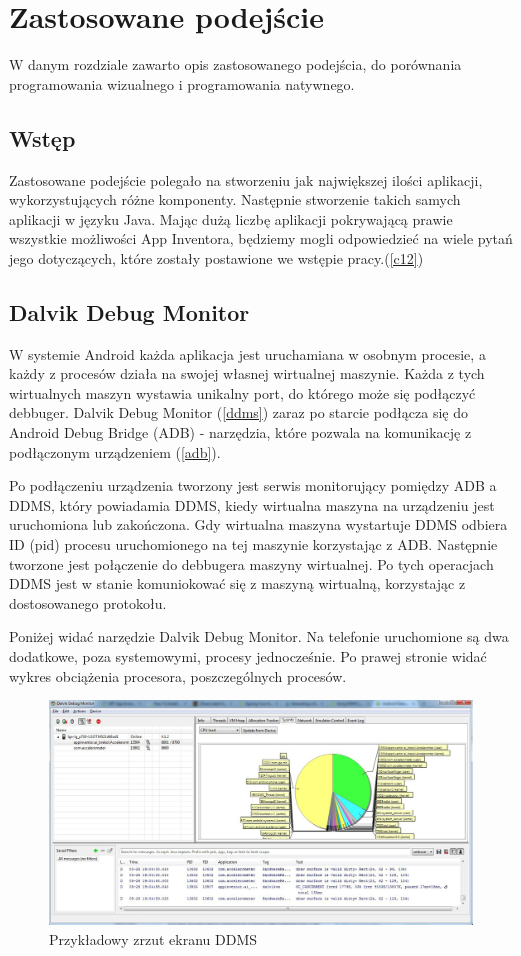 \chapter{Zastosowane podejście}
\label{c4}

W danym rozdziale zawarto opis zastosowanego podejścia, do porównania programowania wizualnego i programowania natywnego.

\section{Wstęp}
\label{c41}

Zastosowane podejście polegało na stworzeniu jak największej ilości aplikacji, wykorzystujących różne komponenty. Następnie stworzenie takich samych aplikacji w języku Java. Mając dużą liczbę aplikacji pokrywającą prawie wszystkie możliwości App Inventora, będziemy mogli odpowiedzieć na wiele pytań jego dotyczących, które zostały postawione we wstępie pracy.(\ref{c12})

\section{Dalvik Debug Monitor}

W systemie Android każda aplikacja jest uruchamiana w osobnym procesie, a każdy z procesów działa na swojej własnej wirtualnej maszynie. Każda z tych wirtualnych maszyn wystawia unikalny port, do którego może się podłączyć debbuger. Dalvik Debug Monitor (\ref{ddms}) zaraz po starcie podłącza się do Android Debug Bridge (ADB) - narzędzia, które pozwala na komunikację z podłączonym urządzeniem (\ref{adb}).

Po podłączeniu urządzenia tworzony jest serwis monitorujący pomiędzy ADB a DDMS, który powiadamia DDMS, kiedy wirtualna maszyna na urządzeniu jest uruchomiona lub zakończona. Gdy wirtualna maszyna wystartuje DDMS odbiera ID (pid) procesu uruchomionego na tej maszynie korzystając z ADB. Następnie tworzone jest połączenie do debbugera maszyny wirtualnej. Po tych operacjach DDMS jest w stanie komuniokować się z maszyną wirtualną, korzystając z dostosowanego protokołu.\cite{doc:ddms}

Poniżej widać narzędzie Dalvik Debug Monitor. Na telefonie uruchomione są dwa dodatkowe, poza systemowymi, procesy jednocześnie. Po prawej stronie widać wykres obciążenia procesora, poszczególnych procesów.

\begin{figure}[H] 
\centering\includegraphics[width=12cm]{figures/dalvik}
\caption{Przykładowy zrzut ekranu DDMS}
\end{figure}

